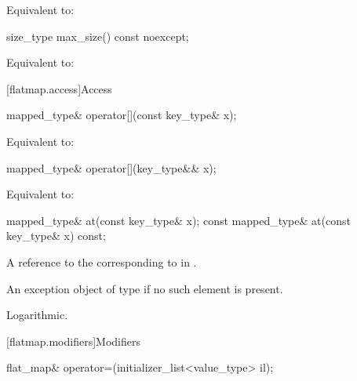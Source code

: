 \begin{codeblock}
\begin{codeblock}
\begin{codeblock}
\begin{addedblock}
\begin{itemdescr}
\pnum
\effects
Equivalent to: 
\end{itemdescr}

%
\begin{itemdecl}
size_type max_size() const noexcept;
\end{itemdecl}

\begin{itemdescr}
\pnum
\effects
Equivalent to: 
\end{itemdescr}

[flatmap.access]{Access}

%
\begin{itemdecl}
mapped_type& operator[](const key_type& x);
\end{itemdecl}

\begin{itemdescr}
\pnum
\effects
Equivalent to: 
\end{itemdescr}

%
\begin{itemdecl}
mapped_type& operator[](key_type&& x);
\end{itemdecl}

\begin{itemdescr}
\pnum
\effects
Equivalent to: 
\end{itemdescr}

%
\begin{itemdecl}
mapped_type&       at(const key_type& x);
const mapped_type& at(const key_type& x) const;
\end{itemdecl}

\begin{itemdescr}
\pnum
\returns
A reference to the  corresponding to  in .

\pnum
\throws
An exception object of type  if
no such element is present.

\pnum
\complexity Logarithmic.
\end{itemdescr}

[flatmap.modifiers]{Modifiers}

%
\begin{itemdecl}
flat_map& operator=(initializer_list<value_type> il);
\end{itemdecl}


\end{addedblock}
\end{codeblock}
\end{codeblock}
\end{codeblock}
